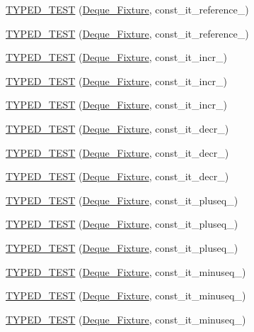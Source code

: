 \begin{DoxyCompactItemize}
\hyperlink{TestDeque_8c_09_09_ae6ca0c459b2ce248cbc35110523d0f76}{T\-Y\-P\-E\-D\-\_\-\-T\-E\-S\-T} (\hyperlink{structDeque__Fixture}{Deque\-\_\-\-Fixture}, const\-\_\-it\-\_\-reference\-\_)
\item 
\hyperlink{TestDeque_8c_09_09_a2d7b34a51d03c3d99143aa38e4fed0cd}{T\-Y\-P\-E\-D\-\_\-\-T\-E\-S\-T} (\hyperlink{structDeque__Fixture}{Deque\-\_\-\-Fixture}, const\-\_\-it\-\_\-reference\-\_)
\item 
\hyperlink{TestDeque_8c_09_09_a5aab97a3dd19ac09c2b236f09183f1e2}{T\-Y\-P\-E\-D\-\_\-\-T\-E\-S\-T} (\hyperlink{structDeque__Fixture}{Deque\-\_\-\-Fixture}, const\-\_\-it\-\_\-incr\-\_)
\item 
\hyperlink{TestDeque_8c_09_09_ab390a41b4fc94450d206e961aa843512}{T\-Y\-P\-E\-D\-\_\-\-T\-E\-S\-T} (\hyperlink{structDeque__Fixture}{Deque\-\_\-\-Fixture}, const\-\_\-it\-\_\-incr\-\_)
\item 
\hyperlink{TestDeque_8c_09_09_a614c83f1185caf82a23633d0c91c4b6d}{T\-Y\-P\-E\-D\-\_\-\-T\-E\-S\-T} (\hyperlink{structDeque__Fixture}{Deque\-\_\-\-Fixture}, const\-\_\-it\-\_\-incr\-\_)
\item 
\hyperlink{TestDeque_8c_09_09_a1acaf6874d30f817bea4404eeaf77b1a}{T\-Y\-P\-E\-D\-\_\-\-T\-E\-S\-T} (\hyperlink{structDeque__Fixture}{Deque\-\_\-\-Fixture}, const\-\_\-it\-\_\-decr\-\_)
\item 
\hyperlink{TestDeque_8c_09_09_a0ece9a194e856fe9757aac0dd9330e4f}{T\-Y\-P\-E\-D\-\_\-\-T\-E\-S\-T} (\hyperlink{structDeque__Fixture}{Deque\-\_\-\-Fixture}, const\-\_\-it\-\_\-decr\-\_)
\item 
\hyperlink{TestDeque_8c_09_09_a10d9b895cd4f3d939ad3d226858b105c}{T\-Y\-P\-E\-D\-\_\-\-T\-E\-S\-T} (\hyperlink{structDeque__Fixture}{Deque\-\_\-\-Fixture}, const\-\_\-it\-\_\-decr\-\_)
\item 
\hyperlink{TestDeque_8c_09_09_aaa5358fa9d5e2a1561e163cc4baf8d3d}{T\-Y\-P\-E\-D\-\_\-\-T\-E\-S\-T} (\hyperlink{structDeque__Fixture}{Deque\-\_\-\-Fixture}, const\-\_\-it\-\_\-pluseq\-\_)
\item 
\hyperlink{TestDeque_8c_09_09_a8a33d52164d7f01637d65dcf55c1c06e}{T\-Y\-P\-E\-D\-\_\-\-T\-E\-S\-T} (\hyperlink{structDeque__Fixture}{Deque\-\_\-\-Fixture}, const\-\_\-it\-\_\-pluseq\-\_)
\item 
\hyperlink{TestDeque_8c_09_09_a200f5d67d42c6a67c3c1e64592d52ef1}{T\-Y\-P\-E\-D\-\_\-\-T\-E\-S\-T} (\hyperlink{structDeque__Fixture}{Deque\-\_\-\-Fixture}, const\-\_\-it\-\_\-pluseq\-\_)
\item 
\hyperlink{TestDeque_8c_09_09_a07217fd680cfc15341f6119b70c33d65}{T\-Y\-P\-E\-D\-\_\-\-T\-E\-S\-T} (\hyperlink{structDeque__Fixture}{Deque\-\_\-\-Fixture}, const\-\_\-it\-\_\-minuseq\-\_)
\item 
\hyperlink{TestDeque_8c_09_09_ae3473c60a30a6491a58cb4de9ec55388}{T\-Y\-P\-E\-D\-\_\-\-T\-E\-S\-T} (\hyperlink{structDeque__Fixture}{Deque\-\_\-\-Fixture}, const\-\_\-it\-\_\-minuseq\-\_)
\item 
\hyperlink{TestDeque_8c_09_09_a8f579255d96437320e83e1d61ce2eec7}{T\-Y\-P\-E\-D\-\_\-\-T\-E\-S\-T} (\hyperlink{structDeque__Fixture}{Deque\-\_\-\-Fixture}, const\-\_\-it\-\_\-minuseq\-\_)
\end{DoxyCompactItemize}


